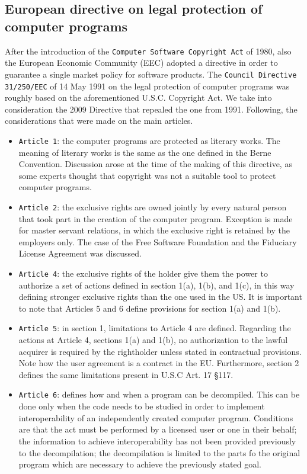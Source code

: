 
\subsection*{European directive on legal protection of computer programs}

After the introduction of the \texttt{Computer Software Copyright Act} of 1980, also the European Economic Community (EEC) adopted a directive in order to guarantee a single market policy for software products. The \texttt{Council Directive 31/250/EEC} of 14 May 1991 on the legal protection of computer programs was roughly based on the aforementioned U.S.C. Copyright Act. We take into consideration the 2009 Directive that repealed the one from 1991. Following, the considerations that were made on the main articles.

\begin{itemize}
    \item \texttt{Article 1}: the computer programs are protected as literary works. The meaning of literary works is the same as the one defined in the Berne Convention. Discussion arose at the time of the making of this directive, as some experts thought that copyright was not a suitable tool to protect computer programs.
    \item \texttt{Article 2}: the exclusive rights are owned jointly by every natural person that took part in the creation of the computer program. Exception is made for master servant relations, in which the exclusive right is retained by the employers only. The case of the Free Software Foundation and the Fiduciary License Agreement was discussed.
    \item \texttt{Article 4}: the exclusive rights of the holder give them the power to authorize a set of actions defined in section 1(a), 1(b), and 1(c), in this way defining stronger exclusive rights than the one used in the US. It is important to note that Articles 5 and 6 define provisions for section 1(a) and 1(b).
    \item \texttt{Article 5}: in section 1, limitations to Article 4 are defined. Regarding the actions at Article 4, sections 1(a) and 1(b), no authorization to the lawful acquirer is required by the rightholder unless stated in contractual provisions. Note how the user agreement is a contract in the EU. Furthermore, section 2 defines the same limitations present in U.S.C Art. 17 \S 117.
    \item \texttt{Article 6}: defines how and when a program can be decompiled. This can be done only when the code needs to be studied in order to implement interoperability of an independently created computer program. Conditions are that the act must be performed by a licensed user or one in their behalf; the information to achieve interoperability has not been provided previously to the decompilation; the decompilation is limited to the parts fo the original program which are necessary to achieve the previously stated goal.
\end{itemize}

